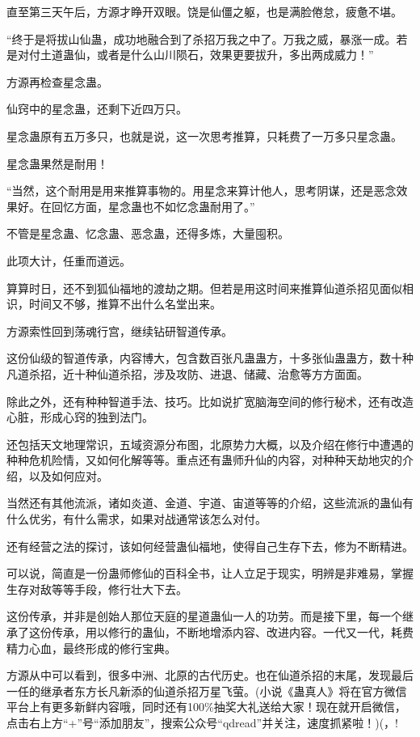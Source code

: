 \begin{this_body}
直至第三天午后，方源才睁开双眼。饶是仙僵之躯，也是满脸倦怠，疲惫不堪。

“终于是将拔山仙蛊，成功地融合到了杀招万我之中了。万我之威，暴涨一成。若是对付土道蛊仙，或者是什么山川陨石，效果更要拔升，多出两成威力！”

方源再检查星念蛊。

仙窍中的星念蛊，还剩下近四万只。

星念蛊原有五万多只，也就是说，这一次思考推算，只耗费了一万多只星念蛊。

星念蛊果然是耐用！

“当然，这个耐用是用来推算事物的。用星念来算计他人，思考阴谋，还是恶念效果好。在回忆方面，星念蛊也不如忆念蛊耐用了。”

不管是星念蛊、忆念蛊、恶念蛊，还得多炼，大量囤积。

此项大计，任重而道远。

算算时日，还不到狐仙福地的渡劫之期。但若是用这时间来推算仙道杀招见面似相识，时间又不够，推算不出什么名堂出来。

方源索性回到荡魂行宫，继续钻研智道传承。

这份仙级的智道传承，内容博大，包含数百张凡蛊蛊方，十多张仙蛊蛊方，数十种凡道杀招，近十种仙道杀招，涉及攻防、进退、储藏、治愈等方方面面。

除此之外，还有种种智道手法、技巧。比如说扩宽脑海空间的修行秘术，还有改造心脏，形成心窍的独到法门。

还包括天文地理常识，五域资源分布图，北原势力大概，以及介绍在修行中遭遇的种种危机险情，又如何化解等等。重点还有蛊师升仙的内容，对种种天劫地灾的介绍，以及如何应对。

当然还有其他流派，诸如炎道、金道、宇道、宙道等等的介绍，这些流派的蛊仙有什么优劣，有什么需求，如果对战通常该怎么对付。

还有经营之法的探讨，该如何经营蛊仙福地，使得自己生存下去，修为不断精进。

可以说，简直是一份蛊师修仙的百科全书，让人立足于现实，明辨是非难易，掌握生存对敌等等手段，修行壮大下去。

这份传承，并非是创始人那位天庭的星道蛊仙一人的功劳。而是接下里，每一个继承了这份传承，用以修行的蛊仙，不断地增添内容、改进内容。一代又一代，耗费精力心血，最终形成的修行宝典。

方源从中可以看到，很多中洲、北原的古代历史。也在仙道杀招的末尾，发现最后一任的继承者东方长凡新添的仙道杀招万星飞萤。(小说《蛊真人》将在官方微信平台上有更多新鲜内容哦，同时还有100\%抽奖大礼送给大家！现在就开启微信，点击右上方“+”号“添加朋友”，搜索公众号“qdread”并关注，速度抓紧啦！)(，!

\end{this_body}

